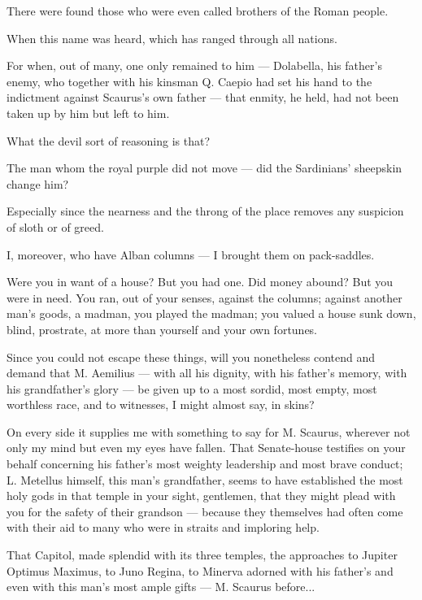  There were found those who were even called brothers of the Roman people.

 When this name was heard, which has ranged through all nations.

 For when, out of many, one only remained to him --- Dolabella, his father's enemy, who together with his kinsman Q. Caepio had set his hand to the indictment against Scaurus's own father --- that enmity, he held, had not been taken up by him but left to him.

 What the devil sort of reasoning is that?

 The man whom the royal purple did not move --- did the Sardinians' sheepskin change him?

 Especially since the nearness and the throng of the place removes any suspicion of sloth or of greed.

 I, moreover, who have Alban columns --- I brought them on pack-saddles.

 Were you in want of a house? But you had one. Did money abound? But you were in need. You ran, out of your senses, against the columns; against another man's goods, a madman, you played the madman; you valued a house sunk down, blind, prostrate, at more than yourself and your own fortunes.

 Since you could not escape these things, will you nonetheless contend and demand that M. Aemilius --- with all his dignity, with his father's memory, with his grandfather's glory --- be given up to a most sordid, most empty, most worthless race, and to witnesses, I might almost say, in skins?

 On every side it supplies me with something to say for M. Scaurus, wherever not only my mind but even my eyes have fallen. That Senate-house testifies on your behalf concerning his father's most weighty leadership and most brave conduct; L. Metellus himself, this man's grandfather, seems to have established the most holy gods in that temple in your sight, gentlemen, that they might plead with you for the safety of their grandson --- because they themselves had often come with their aid to many who were in straits and imploring help.

 That Capitol, made splendid with its three temples, the approaches to Jupiter Optimus Maximus, to Juno Regina, to Minerva adorned with his father's and even with this man's most ample gifts --- M. Scaurus before...

